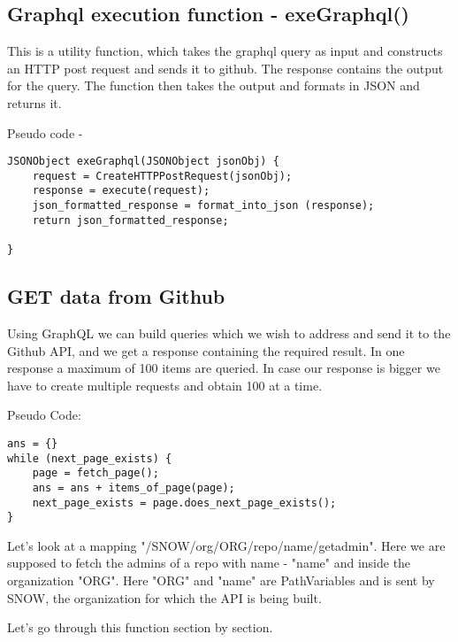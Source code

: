 \subsection{Graphql execution function - exeGraphql()}
This is a utility function, which takes the graphql query as input and constructs an HTTP post request and sends it to github. The response contains the output for the query. The function then takes the output and formats in JSON and returns it.

Pseudo code - 
\begin{lstlisting}[breaklines]
JSONObject exeGraphql(JSONObject jsonObj) {
	request = CreateHTTPPostRequest(jsonObj);
	response = execute(request);
	json_formatted_response = format_into_json (response);
	return json_formatted_response;
	
}
\end{lstlisting}


\subsection{GET data from Github}
Using GraphQL we can build queries which we wish to address and send it to the Github API, and we get a response containing the required result. In one response a maximum of 100 items are queried. In case our response is bigger we have to create multiple requests and obtain 100 at a time.

Pseudo Code:
\begin{lstlisting}[breaklines]
ans = {}
while (next_page_exists) {
	page = fetch_page();
	ans = ans + items_of_page(page);
	next_page_exists = page.does_next_page_exists();
}
\end{lstlisting}

Let's look at a mapping "/SNOW/org/{ORG}/repo/{name}/getadmin". Here we are supposed to fetch the admins of a repo with name - "name" and inside the organization "ORG". Here "ORG" and "name" are PathVariables and is sent by SNOW, the organization for which the API is being built.

Let's go through this function section by section.

